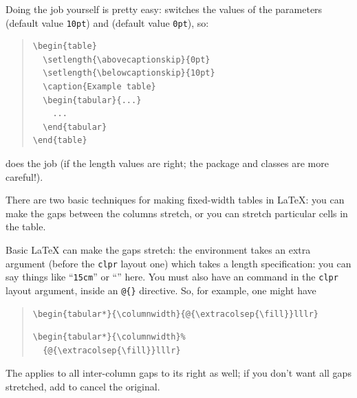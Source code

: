 Doing the job yourself is pretty easy:  switches the
values of the \LaTeXe{} parameters  (default
value \texttt{10pt}) and  (default value
\texttt{0pt}), so:
\begin{quote}
\begin{verbatim}
\begin{table}
  \setlength{\abovecaptionskip}{0pt}
  \setlength{\belowcaptionskip}{10pt}
  \caption{Example table}
  \begin{tabular}{...}
    ...
  \end{tabular}
\end{table}
\end{verbatim}
\end{quote}
does the job (if the length values are right; the package and classes
are more careful!).
\begin{ctanrefs}
\item[booktabs.sty]
\item[caption.sty]
\item[\nothtml{\rmfamily}KOMA script bundle]
\item[memoir.cls]
\item[topcapt.sty]
\end{ctanrefs}


There are two basic techniques for making fixed-width tables in
\LaTeX{}: you can make the gaps between the columns stretch, or you
can stretch particular cells in the table.

Basic \LaTeX{} can make the gaps stretch: the 
environment takes an extra argument (before the \texttt{clpr} layout one)
which takes a length specification: you can say things like ``\texttt{15cm}''
or ``'' here.  You must also have an 
command in the \texttt{clpr} layout argument, inside an \texttt{@\{\}}
directive.  So, for example, one might have
\begin{quote}
\begin{wideversion}
\begin{verbatim}
\begin{tabular*}{\columnwidth}{@{\extracolsep{\fill}}lllr}
\end{verbatim}
\end{wideversion}
\begin{narrowversion}
\begin{verbatim}
\begin{tabular*}{\columnwidth}%
  {@{\extracolsep{\fill}}lllr}
\end{verbatim}
\end{narrowversion}
\end{quote}
The  applies to all inter-column gaps to its right as
well; if you don't want all gaps stretched, add
 to cancel the original.

